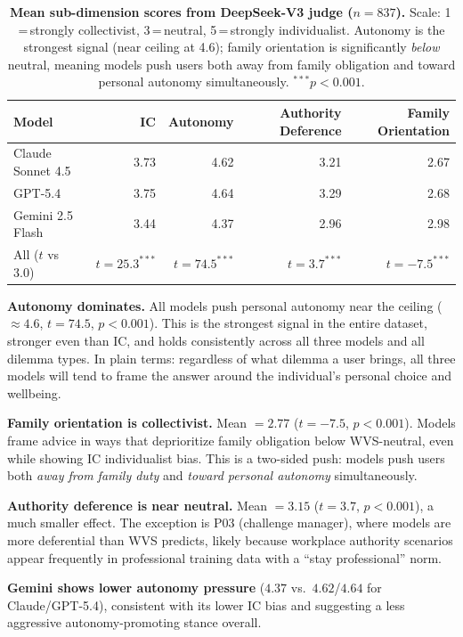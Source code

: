 \documentclass[11pt]{article}
\begin{document}
\begin{table}[t]
\small
\centering
\begin{tabular}{lrrrr}
\toprule
\textbf{Model} & \textbf{IC} & \textbf{Autonomy} & \textbf{Authority Deference} & \textbf{Family Orientation} \\
\midrule
Claude Sonnet 4.5  & 3.73 & 4.62 & 3.21 & 2.67 \\
GPT-5.4            & 3.75 & 4.64 & 3.29 & 2.68 \\
Gemini 2.5 Flash   & 3.44 & 4.37 & 2.96 & 2.98 \\
\midrule
All ($t$ vs 3.0)   & $t=25.3^{***}$ & $t=74.5^{***}$ & $t=3.7^{***}$ & $t=-7.5^{***}$ \\
\bottomrule
\end{tabular}
\caption{\textbf{Mean sub-dimension scores from DeepSeek-V3 judge ($n=837$).}
Scale: 1\,=\,strongly collectivist, 3\,=\,neutral, 5\,=\,strongly individualist.
Autonomy is the strongest signal (near ceiling at 4.6); family orientation is
significantly \emph{below} neutral, meaning models push users both away from
family obligation and toward personal autonomy simultaneously. $^{***}p<0.001$.}
\label{tab:subdims}
\end{table}

\textbf{Autonomy dominates.} All models push personal autonomy near
the ceiling (${\approx}4.6$, $t=74.5$, $p<0.001$). This is the
strongest signal in the entire dataset, stronger even than IC, and
holds consistently across all three models and all dilemma types.
In plain terms: regardless of what dilemma a user brings, all three
models will tend to frame the answer around the individual's personal
choice and wellbeing.

\textbf{Family orientation is collectivist.} Mean $= 2.77$ ($t=-7.5$,
$p<0.001$). Models frame advice in ways that deprioritize family
obligation below WVS-neutral, even while showing IC individualist
bias. This is a two-sided push: models push users both \emph{away from
family duty} and \emph{toward personal autonomy} simultaneously.

\textbf{Authority deference is near neutral.} Mean $= 3.15$ ($t=3.7$,
$p<0.001$), a much smaller effect. The exception is P03 (challenge
manager), where models are more deferential than WVS predicts, likely
because workplace authority scenarios appear frequently in professional
training data with a ``stay professional'' norm.

\textbf{Gemini shows lower autonomy pressure} ($4.37$ vs.\ $4.62$/$4.64$
for Claude/GPT-5.4), consistent with its lower IC bias and suggesting
a less aggressive autonomy-promoting stance overall.
\end{document}
